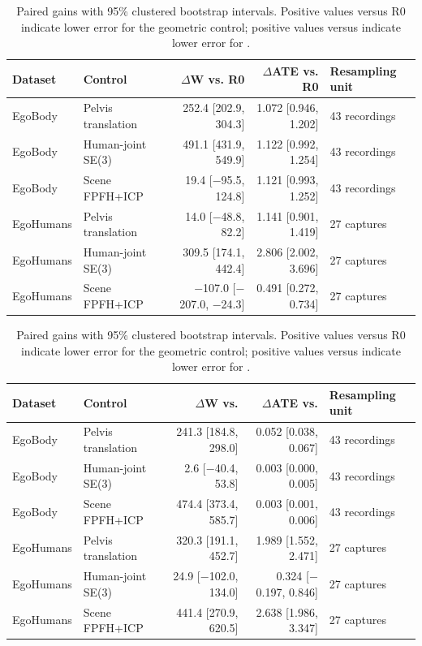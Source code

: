 \begin{table}[t]
  \centering
  \caption{Paired gains with 95\% clustered bootstrap intervals. Positive
  values versus R0 indicate lower error for the geometric control; positive
  values versus \method{} indicate lower error for \method{}.}
  \label{tab:supp-registration-paired}
  \supptablesize
  \setlength{\tabcolsep}{4pt}
  \begin{tabular}{llrrl}
    \toprule
    Dataset & Control & $\Delta$W vs. R0 & $\Delta$ATE vs. R0 & Resampling unit \\
    \midrule
    EgoBody & Pelvis translation & 252.4 [202.9, 304.3] & 1.072 [0.946, 1.202] & 43 recordings \\
    EgoBody & Human-joint SE(3) & 491.1 [431.9, 549.9] & 1.122 [0.992, 1.254] & 43 recordings \\
    EgoBody & Scene FPFH+ICP & 19.4 [$-$95.5, 124.8] & 1.121 [0.993, 1.252] & 43 recordings \\
    \midrule
    EgoHumans & Pelvis translation & 14.0 [$-$48.8, 82.2] & 1.141 [0.901, 1.419] & 27 captures \\
    EgoHumans & Human-joint SE(3) & 309.5 [174.1, 442.4] & 2.806 [2.002, 3.696] & 27 captures \\
    EgoHumans & Scene FPFH+ICP & $-$107.0 [$-$207.0, $-$24.3] & 0.491 [0.272, 0.734] & 27 captures \\
    \bottomrule
  \end{tabular}

  \vspace{4pt}

  \begin{tabular}{llrrl}
    \toprule
    Dataset & Control & $\Delta$W vs. \method{} & $\Delta$ATE vs. \method{} & Resampling unit \\
    \midrule
    EgoBody & Pelvis translation & 241.3 [184.8, 298.0] & 0.052 [0.038, 0.067] & 43 recordings \\
    EgoBody & Human-joint SE(3) & 2.6 [$-$40.4, 53.8] & 0.003 [0.000, 0.005] & 43 recordings \\
    EgoBody & Scene FPFH+ICP & 474.4 [373.4, 585.7] & 0.003 [0.001, 0.006] & 43 recordings \\
    \midrule
    EgoHumans & Pelvis translation & 320.3 [191.1, 452.7] & 1.989 [1.552, 2.471] & 27 captures \\
    EgoHumans & Human-joint SE(3) & 24.9 [$-$102.0, 134.0] & 0.324 [$-$0.197, 0.846] & 27 captures \\
    EgoHumans & Scene FPFH+ICP & 441.4 [270.9, 620.5] & 2.638 [1.986, 3.347] & 27 captures \\
    \bottomrule
  \end{tabular}
\end{table}

